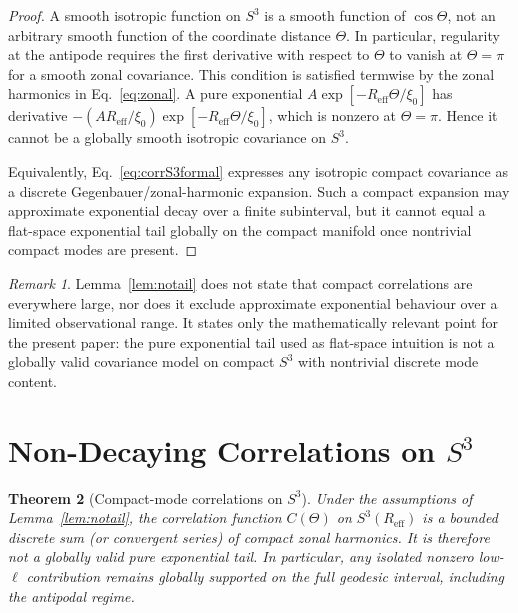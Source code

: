 \documentclass[
  aps,
  prd,
  reprint,
  superscriptaddress,
  nofootinbib,
  longbibliography,
  floatfix,
  amsmath,
  amssymb
]{revtex4-2}
\theoremstyle{plain}
\newtheorem{theorem}{Theorem}
\theoremstyle{definition}
\theoremstyle{remark}
\newtheorem{remark}[theorem]{Remark}
\newcommand{\Sthree}{S^3}
\newcommand{\Reff}{R_{\mathrm{eff}}}
\begin{document}
\begin{proof}
  A smooth isotropic function on $\Sthree$ is a smooth function of
  $\cos\Theta$, not an arbitrary smooth function of the coordinate
  distance $\Theta$. In particular, regularity at the antipode requires
  the first derivative with respect to $\Theta$ to vanish at
  $\Theta=\pi$ for a smooth zonal covariance. This condition is satisfied
  termwise by the zonal harmonics in Eq.~\eqref{eq:zonal}. A pure
  exponential $A\exp[-\Reff\Theta/\xi_0]$ has derivative
  $-(A\Reff/\xi_0)\exp[-\Reff\Theta/\xi_0]$, which is nonzero at
  $\Theta=\pi$. Hence it cannot be a globally smooth isotropic covariance
  on $S^3$.

  Equivalently, Eq.~\eqref{eq:corrS3formal} expresses any isotropic
  compact covariance as a discrete Gegenbauer/zonal-harmonic expansion.
  Such a compact expansion may approximate exponential decay over a
  finite subinterval, but it cannot equal a flat-space exponential tail
  globally on the compact manifold once nontrivial compact modes are
  present.
\end{proof}

\begin{remark}
  Lemma~\ref{lem:notail} does not state that compact correlations are
  everywhere large, nor does it exclude approximate exponential behaviour
  over a limited observational range. It states only the mathematically
  relevant point for the present paper: the pure exponential tail used as
  flat-space intuition is not a globally valid covariance model on
  compact $\Sthree$ with nontrivial discrete mode content.
\end{remark}

\section{Non-Decaying Correlations on $S^3$}
\label{sec:correlations}

\begin{theorem}[Compact-mode correlations on $S^3$]
  \label{thm:nodecay}
  Under the assumptions of Lemma~\ref{lem:notail}, the correlation
  function $C(\Theta)$ on $\Sthree(\Reff)$ is a bounded discrete sum (or
  convergent series) of compact zonal harmonics. It is therefore not a
  globally valid pure exponential tail. In particular, any isolated
  nonzero low-$\ell$ contribution remains globally supported on the full
  geodesic interval, including the antipodal regime.
\end{theorem}
\end{document}
